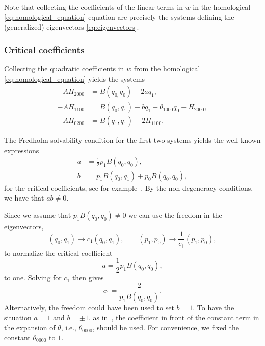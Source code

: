 Note that collecting the coefficients of the linear terms in $w$ in the
homological \cref{eq:homological_equation} equation are precisely the systems
defining the (generalized) eigenvectors \cref{eq:eigenvectors}. 


\subsubsection{Critical coefficients}%

Collecting the quadratic coefficients in $w$ from the homological
\cref{eq:homological_equation} yields the systems
%
\begin{align}
-AH_{2000} &= B(q_{0,}q_0) - 2aq_1, \label{eq:AH2000} \\
-AH_{1100} &= B(q_0,q_1) - bq_1 + \theta_{1000}q_0 - H_{2000},  \label{eq:AH1100} \\
-AH_{0200} &= B(q_1,q_1) - 2H_{1100}. \label{eq:AH0200} 
\end{align}

The Fredholm solvability condition for the first two systems yields the well-known expressions
\begin{align*}
a &= \frac12 p_1 B(q_0,q_0), \\
b &= p_1 B(q_0, q_1) + p_0 B(q_0, q_0),
\end{align*}
for the critical coefficients, see for example~\cite{Kuznetsov1999}. By the
non-degeneracy conditions, we have that $ab \neq 0$.

\begin{remark}
Since we assume that $p_1 B(q_0,q_0) \neq 0$ we can use the freedom in the
eigenvectors,
\[
(q_0, q_1) \to c_1 (q_0,q_1), \qquad
(p_1, p_0) \to \frac1{c_1} (p_1, p_0),
\]	
to normalize the critical coefficient
\[
a= \frac12 p_1 B(q_0, q_0),
\]
to one. Solving for $c_1$ then gives
\[
c_1=\frac2{p_1 B(q_0, q_0)}.
\]
Alternatively, the freedom could have been used to set $b=1$. To have the
situation $a=1$ and $b=\pm1$, as in~\cite{Broer1991}, the coefficient in front
of the constant term in the expansion of $\theta$, i.e., $\theta_{0000}$, should
be used. For convenience, we fixed the constant $\theta_{0000}$ to $1$.
\end{remark}


